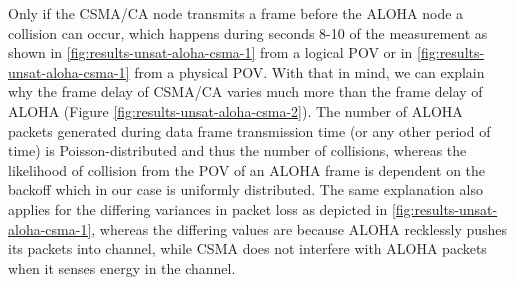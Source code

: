 Only if the CSMA/CA node transmits a frame before the ALOHA node a collision can occur, which happens during seconds 8-10 of the measurement as shown in \ref{fig:results-unsat-aloha-csma-1} from a logical POV or in  \ref{fig:results-unsat-aloha-csma-1} from a physical POV. With that in mind, we can explain why the frame delay of CSMA/CA varies much more than the frame delay of ALOHA (Figure  \ref{fig:results-unsat-aloha-csma-2}). The number of ALOHA packets generated during data frame transmission time (or any other period of time) is Poisson-distributed and thus the number of collisions, whereas the likelihood of collision from the POV of an ALOHA frame is dependent on the backoff which in our case is uniformly distributed. The same explanation also applies for the differing variances in packet loss as depicted in \ref{fig:results-unsat-aloha-csma-1}, whereas the differing values are because ALOHA recklessly pushes its packets into channel, while CSMA does not interfere with ALOHA packets when it senses energy in the channel.

